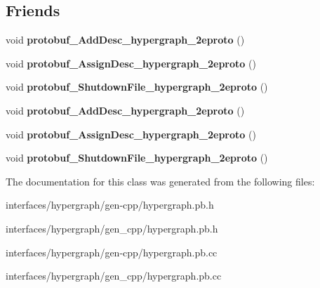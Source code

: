 \subsection*{Friends}
\begin{DoxyCompactItemize}
\item 
\hypertarget{classHypergraph__Node_aed4781a70bb54c95ce4bb1aa4f20b05c}{
void {\bfseries protobuf\_\-AddDesc\_\-hypergraph\_\-2eproto} ()}
\label{classHypergraph__Node_aed4781a70bb54c95ce4bb1aa4f20b05c}

\item 
\hypertarget{classHypergraph__Node_a3cbaa41d7f7b73db437c4e7d1edcb4f3}{
void {\bfseries protobuf\_\-AssignDesc\_\-hypergraph\_\-2eproto} ()}
\label{classHypergraph__Node_a3cbaa41d7f7b73db437c4e7d1edcb4f3}

\item 
\hypertarget{classHypergraph__Node_a424acd7e96228bbed0dba9436582d3c1}{
void {\bfseries protobuf\_\-ShutdownFile\_\-hypergraph\_\-2eproto} ()}
\label{classHypergraph__Node_a424acd7e96228bbed0dba9436582d3c1}

\item 
\hypertarget{classHypergraph__Node_aed4781a70bb54c95ce4bb1aa4f20b05c}{
void {\bfseries protobuf\_\-AddDesc\_\-hypergraph\_\-2eproto} ()}
\label{classHypergraph__Node_aed4781a70bb54c95ce4bb1aa4f20b05c}

\item 
\hypertarget{classHypergraph__Node_a3cbaa41d7f7b73db437c4e7d1edcb4f3}{
void {\bfseries protobuf\_\-AssignDesc\_\-hypergraph\_\-2eproto} ()}
\label{classHypergraph__Node_a3cbaa41d7f7b73db437c4e7d1edcb4f3}

\item 
\hypertarget{classHypergraph__Node_a424acd7e96228bbed0dba9436582d3c1}{
void {\bfseries protobuf\_\-ShutdownFile\_\-hypergraph\_\-2eproto} ()}
\label{classHypergraph__Node_a424acd7e96228bbed0dba9436582d3c1}

\end{DoxyCompactItemize}


The documentation for this class was generated from the following files:\begin{DoxyCompactItemize}
\item 
interfaces/hypergraph/gen-\/cpp/hypergraph.pb.h\item 
interfaces/hypergraph/gen\_\-cpp/hypergraph.pb.h\item 
interfaces/hypergraph/gen-\/cpp/hypergraph.pb.cc\item 
interfaces/hypergraph/gen\_\-cpp/hypergraph.pb.cc\end{DoxyCompactItemize}
